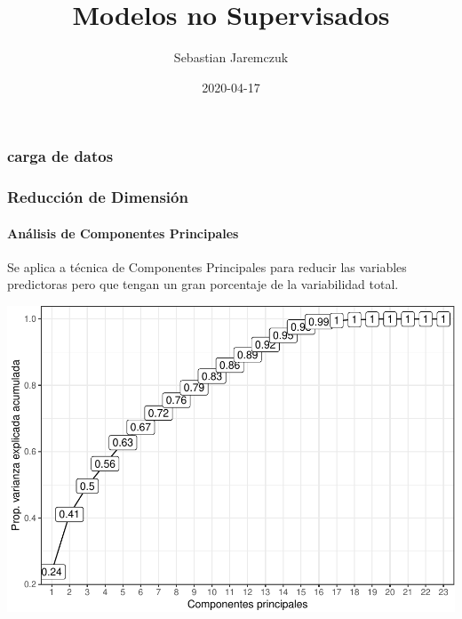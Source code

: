\documentclass[]{article}
\title{Modelos no Supervisados}
\author{Sebastian Jaremczuk}
\date{2020-04-17}
\let\oldparagraph\paragraph
\renewcommand{\paragraph}[1]{\oldparagraph{#1}\mbox{}}
\begin{document}
\maketitle

\hypertarget{carga-de-datos}{%
\subsubsection{carga de datos}\label{carga-de-datos}}

\hypertarget{reducciuxf3n-de-dimensiuxf3n}{%
\subsubsection{Reducción de
Dimensión}\label{reducciuxf3n-de-dimensiuxf3n}}

\hypertarget{anuxe1lisis-de-componentes-principales}{%
\paragraph{Análisis de Componentes
Principales}\label{anuxe1lisis-de-componentes-principales}}

Se aplica a técnica de Componentes Principales para reducir las
variables predictoras pero que tengan un gran porcentaje de la
variabilidad total.

\includegraphics{00_pca_tsne_cluster_files/figure-latex/unnamed-chunk-7-1.pdf}
\end{document}
